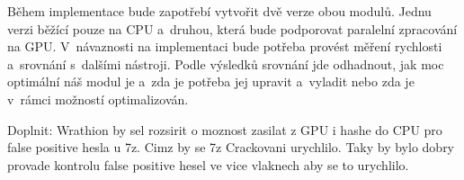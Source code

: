 Během implementace bude zapotřebí vytvořit dvě verze obou modulů. Jednu verzi běžící pouze na
CPU a~druhou, která bude podporovat paralelní zpracování na GPU. V~návaznosti na implementaci
bude potřeba provést měření rychlosti a~srovnání s~dalšími nástroji. Podle výsledků srovnání
jde odhadnout, jak moc optimální náš modul je a~zda je potřeba jej upravit a~vyladit nebo
zda je v~rámci možností optimalizován.


Doplnit: Wrathion by sel rozsirit o moznost zasilat z GPU i hashe do CPU pro false positive hesla
u 7z. Cimz by se 7z Crackovani urychlilo. Taky by bylo dobry provade kontrolu false positive hesel
ve vice vlaknech aby se to urychlilo.

